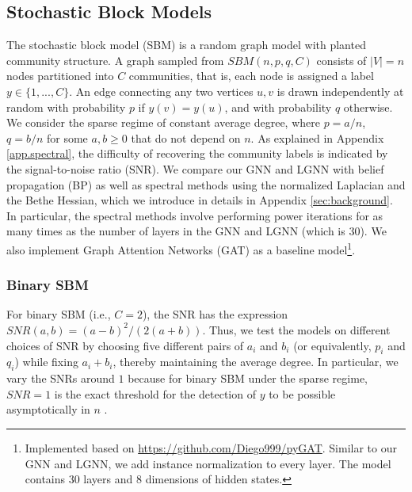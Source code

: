 \documentclass{article} \usepackage{iclr2019_conference,times}
\begin{document}
\subsection{Stochastic Block Models}
\label{SBMsec1}

The stochastic block model (SBM) is a random graph model with planted community structure. A graph sampled from $SBM(n, p, q, C)$ consists of $|V| = n$ nodes partitioned into $C$ communities, that is, each node is assigned a label $y \in \{1, ..., C\}$. An edge connecting any two vertices $u, v$ is drawn independently at random with probability $p$ if $y(v) = y(u)$, and with probability $q$ otherwise. We consider the sparse regime of constant average degree, where $p = a/n$, $q=b/n$ for some $a, b \geq 0$ that do not depend on $n$. As explained in Appendix \ref{app.spectral}, the difficulty of recovering the community labels is indicated by the signal-to-noise ratio (SNR). We compare our GNN and LGNN with belief propagation (BP) as well as spectral methods using the normalized Laplacian and the Bethe Hessian, which we introduce in details in Appendix \ref{sec:background}. In particular, the spectral methods involve performing power iterations for as many times as the number of layers in the GNN and LGNN (which is $30$). We also implement Graph Attention Networks (GAT) as a baseline model\footnote{Implemented based on \url{https://github.com/Diego999/pyGAT}. Similar to our GNN and LGNN, we add instance normalization to every layer. The model contains 30 layers and 8 dimensions of hidden states.}.

\subsubsection{Binary SBM}
For binary SBM (i.e., $C=2$), the SNR has the expression $SNR(a, b) = (a - b)^2 / (2(a+b))$. Thus, we test the models on different choices of SNR by choosing five different pairs of $a_i$ and $b_i$ (or equivalently, $p_i$ and $q_i$) while fixing $a_i + b_i$, thereby maintaining the average degree. In particular, we vary the SNRs around $1$ because for binary SBM under the sparse regime, $SNR = 1$ is the exact threshold for the detection of $y$ to be possible asymptotically in $n$ \citep{abbe2017community}.
\end{document}
